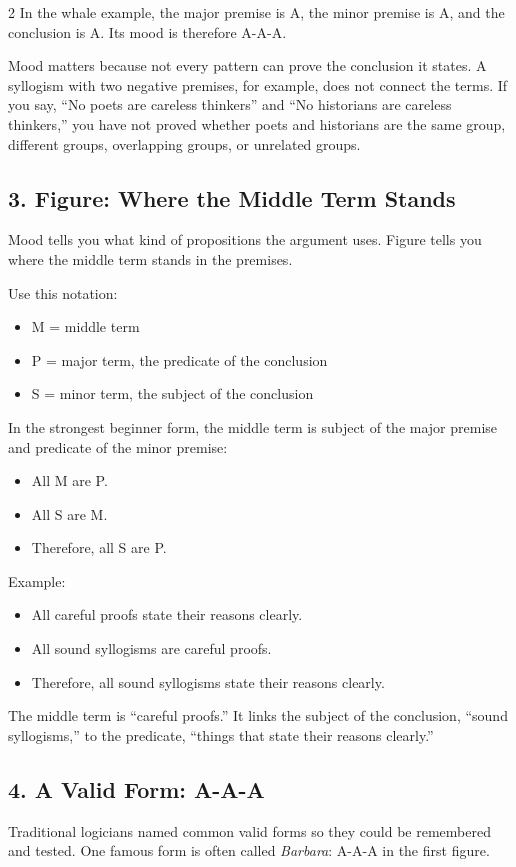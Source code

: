 \documentclass[12pt]{article}
\begin{document}
\begin{multicols}{2}
In the whale example, the major premise is A, the minor premise is A, and the conclusion is A. Its mood is therefore A-A-A.

Mood matters because not every pattern can prove the conclusion it states. A syllogism with two negative premises, for example, does not connect the terms. If you say, ``No poets are careless thinkers'' and ``No historians are careless thinkers,'' you have not proved whether poets and historians are the same group, different groups, overlapping groups, or unrelated groups.

\subsection*{3. Figure: Where the Middle Term Stands}
Mood tells you what kind of propositions the argument uses. Figure tells you where the middle term stands in the premises.

Use this notation:
\begin{itemize}[leftmargin=*]
\item M = middle term
\item P = major term, the predicate of the conclusion
\item S = minor term, the subject of the conclusion
\end{itemize}

In the strongest beginner form, the middle term is subject of the major premise and predicate of the minor premise:
\begin{itemize}[leftmargin=*]
\item All M are P.
\item All S are M.
\item Therefore, all S are P.
\end{itemize}

Example:
\begin{itemize}[leftmargin=*]
\item All careful proofs state their reasons clearly.
\item All sound syllogisms are careful proofs.
\item Therefore, all sound syllogisms state their reasons clearly.
\end{itemize}

The middle term is ``careful proofs.'' It links the subject of the conclusion, ``sound syllogisms,'' to the predicate, ``things that state their reasons clearly.''

\subsection*{4. A Valid Form: A-A-A}
Traditional logicians named common valid forms so they could be remembered and tested. One famous form is often called \textit{Barbara}: A-A-A in the first figure.


\end{multicols}
\end{document}
